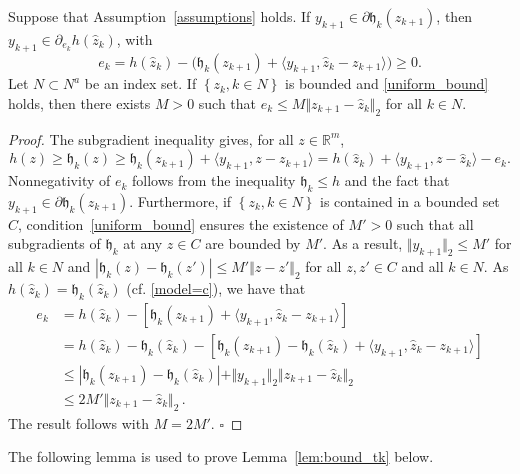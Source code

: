 \documentclass[smallextended,envcountsect]{svjour3}
\newcommand{\norm}[1]{\textstyle{\Vert} #1 \textstyle{\Vert}_2}
\newcommand{\col}[1]{\left\{#1\right\}}
\newcommand{\inner}[2]{\langle#1,#2\rangle}
\renewcommand{\Re}{\mathbb{R}}
\newcommand{\modelh}{\mathfrak{h}}
\newcommand{\mybox}{{\hfill $\square$}}
\begin{document}
\begin{lemma}\label{lem:approx-sub} Suppose that Assumption~\ref{assumptions} holds. If $y_{k+1}\in \partial \modelh_k(z_{k+1})$, then $y_{k+1}\in \partial_{e_k} h(\hat z_{k})$, with 
\[
e_k = h(\hat z_{k}) - \big(\modelh_k(z_{k+1}) + \inner{y_{k+1}}{\hat z_k - z_{k+1}}\big) \geq 0.
\]
Let $N\subset N^a$ be an index set. If $\col{z_k,k \in N}$ is bounded and \eqref{uniform_bound} holds, then there exists $M>0$ such that $e_k\leq M\norm{z_{k+1}-\hat z_k}$ for all $k\in N$.
\end{lemma}
\begin{proof}
The subgradient inequality gives, for all $z \in \Re^m$,
\[
h(z)\geq \modelh_k(z)\geq \modelh_k(z_{k+1}) + \inner{y_{k+1}}{z - z_{k+1}}
= h(\hat z_{k}) + \inner{y_{k+1}}{z - \hat z_{k}} - e_k.
\]
Nonnegativity of $e_k$ follows from the inequality $\modelh_k\leq h$ and the fact that $y_{k+1}\in \partial \modelh_k(z_{k+1})$. Furthermore, if $\col{z_k,k\in N}$ is contained in a bounded set $C$, condition~\eqref{uniform_bound} ensures the existence of $M'>0$ such that all subgradients of $\modelh_k$ at any $z\in C$ are bounded by $M'$. As a result, $\norm{y_{k+1}}\leq M'$ for all $k\in N$ and 
$|\modelh_k(z)-\modelh_k(z')|\leq M'\norm{z-z'}$ for all $z,z'\in C$ and all $k\in N$.
As $h(\hat z_{k})=\modelh_k(\hat z_{k})$  (cf. \eqref{model=c}), we have that
\begin{align*}
e_k&= h(\hat z_{k}) - [\modelh_k(z_{k+1}) + \inner{y_{k+1}}{\hat z_k - z_{k+1}}]\\
&= h(\hat z_{k})-\modelh_k(\hat z_{k}) - [\modelh_k(z_{k+1})-\modelh_k(\hat z_{k}) + \inner{y_{k+1}}{\hat z_k - z_{k+1}}] \\
&\leq |\modelh_k(z_{k+1})-\modelh_k(\hat z_{k})|+\norm{y_{k+1}}\norm{z_{k+1} -\hat z_k}\\
& \leq 2M'\norm{z_{k+1} -\hat z_k}\,. 
\end{align*}
The result follows with $M=2M'$.
\mybox
\end{proof}

The following lemma is used to prove Lemma~\ref{lem:bound_tk} below. 
\end{document}
